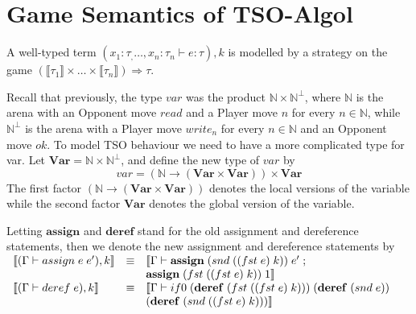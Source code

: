 \documentclass{article}
\begin{document}
\section{Game Semantics of TSO-Algol}
A well-typed term $(x_1 : \tau_,\ldots, x_n : \tau_n \vdash e : \tau), k$ is
modelled by a strategy on the game $(\llbracket \tau_1 \rrbracket \times
\ldots \times \llbracket \tau_n \rrbracket) \Rightarrow \tau$.

Recall that previously, the type $var$ was the product $\mathbb{N} \times
\mathbb{N}^{\bot}$, where $\mathbb{N}$ is the arena with an Opponent move $read$
and a Player move $n$ for every $n \in \mathbb{N}$, while $\mathbb{N}^{\bot}$ is
the arena with a Player move $write_n$ for every $n \in \mathbb{N}$ and an
Opponent move $ok$. To model TSO behaviour we need to have a more complicated
type for var. Let $\mathbf{Var} = \mathbb{N} \times
\mathbb{N}^{\bot}$, and define the new type of $var$ by
$$var = (\mathbb{N} \longrightarrow (\mathbf{Var} \times \mathbf{Var})) \times
\mathbf{Var}$$
The first factor $(\mathbb{N} \longrightarrow (\mathbf{Var} \times
\mathbf{Var}))$ denotes the local versions of the variable while the second factor
$\mathbf{Var}$ denotes the global version of the variable.

Letting $\mathbf{assign}$ and $\mathbf{deref}$ stand for the old assignment and
dereference statements, then we denote the new assignment and
dereference statements by 
$\begin{array}{ l l l}
\llbracket (\Gamma \vdash assign \; e \; e'), k \rrbracket &\equiv
& \llbracket \Gamma \vdash \mathbf{assign} \; (snd \; ((fst \; e) \; k)) \;
e' \; ; \;\\
& & \mathbf{assign} \; (fst \; ((fst \; e) \; k)) \; 1 \rrbracket\\
\llbracket (\Gamma \vdash deref \; e), k \rrbracket &\equiv
&\llbracket \Gamma \vdash if0 \; (\mathbf{deref} \; (fst \; ((fst \; e) \; k)))
\; (\mathbf{deref} \; (snd \; e)) \\
& &(\mathbf{deref} \; (snd \; ((fst \; e) \; k)))
\rrbracket
\end{array}$
\end{document}
